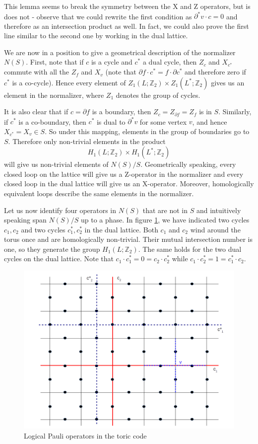 \documentclass[a4paper, draft]{article}
\theoremstyle{own}
\theoremstyle{remark}
\newcommand{\Z}{\mathbb{Z}}
\begin{document}
This lemma seems to break the symmetry between the X and Z operators, but is does not - observe that we could rewrite the first condition as $\partial^*v \cdot c = 0$ and therefore as an intersection product as well. In fact, we could also prove the first line similar to the second one by working in the dual lattice. 

We are now in a position to give a geometrical description of the normalizer $N(S)$. First, note that if $c$ is a cycle and $c^*$ a dual cycle, then $Z_c$ and $X_{c^*}$ commute with all the $Z_f$ and $X_v$ (note that $\partial f \cdot c^* = f \cdot \partial c^*$ and therefore zero if $c^*$ is a co-cycle). Hence every element of $Z_1(L;\Z_2) \times Z_1(L^*;\Z_2)$ gives us an element in the normalizer, where $Z_1$ denotes the group of cycles. 

It is also clear that if $c = \partial f$ is a boundary, then $Z_c = Z_{\partial f} = Z_f$ is in $S$. Similarly, if $c^*$ is a co-boundary, then $c^*$ is dual to $\partial^* v$ for some vertex $v$, and hence $X_{c^*} = X_v \in S$. So under this mapping, elements in the group of boundaries go to $S$. Therefore only non-trivial elements in the product
$$
H_1(L;\Z_2) \times H_1(L^*;\Z_2) 
$$
will give us non-trivial elements of $N(S) / S$. Geometrically speaking, every closed loop on the lattice will give us a Z-operator in the normalizer and every closed loop in the dual lattice will give us an X-operator. Moreover, homologically equivalent loops describe the same elements in the normalizer. 


Let us now identify four operators in $N(S)$ that are not in $S$ and intuitively speaking span $N(S) / S$ up to a phase. In figure \ref{fig:ToricCodeLogicalPauliMatrices}, we have indicated two cycles $c_1, c_2$ and two cycles $c^*_1, c^*_2$ in the dual lattice. Both $c_1$ and $c_2$ wind around the torus once and are homologically non-trivial. Their mutual intersection number is one, so they generate the group $H_1(L;\Z_2)$. The same holds for the two dual cycles on the dual lattice. Note that $c_1 \cdot c_1^* = 0 = c_2 \cdot c_2^*$ while $c_1 \cdot c_2^* = 1 = c_1^* \cdot c_2$. 

\begin{figure}[ht]
\centering
\includegraphics[width=0.7\linewidth]{images/ToricCodeLogicalPauliMatrices}
\caption[Logical Pauli operators in the toric code]{Logical Pauli operators in the toric code}
\label{fig:ToricCodeLogicalPauliMatrices}
\end{figure}
\end{document}
